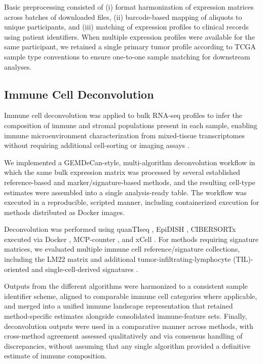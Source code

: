 \documentclass[conference]{IEEEtran}
\begin{document}
Basic preprocessing consisted of (i) format harmonization of expression matrices across batches of downloaded files, (ii) barcode-based mapping of aliquots to unique participants, and (iii) matching of expression profiles to clinical records using patient identifiers.
When multiple expression profiles were available for the same participant, we retained a single primary tumor profile according to TCGA sample type conventions to ensure one-to-one sample matching for downstream analyses.

\subsection{Immune Cell Deconvolution}
Immune cell deconvolution was applied to bulk RNA-seq profiles to infer the composition of immune and stromal populations present in each sample, enabling immune microenvironment characterization from mixed-tissue transcriptomes without requiring additional cell-sorting or imaging assays \cite{Newman2015,Finotello2019,Becht2016,Aran2017xCell}.

We implemented a GEMDeCan-style, multi-algorithm deconvolution workflow in which the same bulk expression matrix was processed by several established reference-based and marker/signature-based methods, and the resulting cell-type estimates were assembled into a single analysis-ready table.
The workflow was executed in a reproducible, scripted manner, including containerized execution for methods distributed as Docker images.

Deconvolution was performed using quanTIseq \cite{Finotello2019}, EpiDISH \cite{Zheng2017EpiDISH}, CIBERSORTx executed via Docker \cite{Newman2019CIBERSORTx}, MCP-counter \cite{Becht2016}, and xCell \cite{Aran2017xCell}.
For methods requiring signature matrices, we evaluated multiple immune cell reference/signature collections, including the LM22 matrix and additional tumor-infiltrating-lymphocyte (TIL)-oriented and single-cell-derived signatures \cite{Newman2015}.

Outputs from the different algorithms were harmonized to a consistent sample identifier scheme, aligned to comparable immune cell categories where applicable, and merged into a unified immune landscape representation that retained method-specific estimates alongside consolidated immune-feature sets.
Finally, deconvolution outputs were used in a comparative manner across methods, with cross-method agreement assessed qualitatively and via consensus handling of discrepancies, without assuming that any single algorithm provided a definitive estimate of immune composition.
\end{document}
